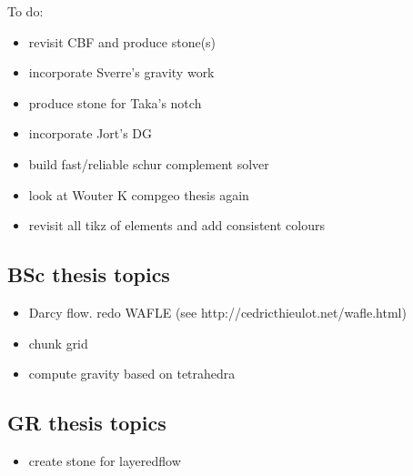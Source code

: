 To do:

\begin{itemize}
\item revisit CBF and produce stone(s)
\item incorporate Sverre's gravity work
\item produce stone for Taka's notch
\item incorporate Jort's DG 
\item build fast/reliable schur complement solver\
\item look at Wouter K compgeo thesis again
\item revisit all tikz of elements and add consistent colours
\end{itemize}



\subsection{BSc thesis topics}
\begin{itemize} 
\item Darcy flow. redo WAFLE (see http://cedricthieulot.net/wafle.html)
\item chunk grid
\item compute gravity based on tetrahedra
\end{itemize}

\subsection{GR thesis topics}
\begin{itemize} 
\item create stone for layeredflow 
\end{itemize}

